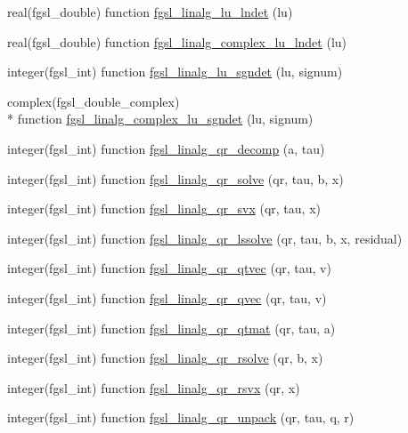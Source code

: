 \begin{DoxyCompactItemize}
\item 
real(fgsl\-\_\-double) function \hyperlink{linalg_8finc_a52edf61cc5516e7caf8519816c749ab8}{fgsl\-\_\-linalg\-\_\-lu\-\_\-lndet} (lu)
\item 
real(fgsl\-\_\-double) function \hyperlink{linalg_8finc_a92abce3042e05ad514f7f22b06ed8c27}{fgsl\-\_\-linalg\-\_\-complex\-\_\-lu\-\_\-lndet} (lu)
\item 
integer(fgsl\-\_\-int) function \hyperlink{linalg_8finc_ad630c42318782e35aae8ddf417c988c7}{fgsl\-\_\-linalg\-\_\-lu\-\_\-sgndet} (lu, signum)
\item 
complex(fgsl\-\_\-double\-\_\-complex) \\*
function \hyperlink{linalg_8finc_a3ac75e4a38e037d1b4b652e84030665b}{fgsl\-\_\-linalg\-\_\-complex\-\_\-lu\-\_\-sgndet} (lu, signum)
\item 
integer(fgsl\-\_\-int) function \hyperlink{linalg_8finc_abae4bc6bf64efb5860b999ae7001bda7}{fgsl\-\_\-linalg\-\_\-qr\-\_\-decomp} (a, tau)
\item 
integer(fgsl\-\_\-int) function \hyperlink{linalg_8finc_a453aab0af228f854c2c4e21af6e0f950}{fgsl\-\_\-linalg\-\_\-qr\-\_\-solve} (qr, tau, b, x)
\item 
integer(fgsl\-\_\-int) function \hyperlink{linalg_8finc_a7029ed3e4a0df13a7599a87f5260e377}{fgsl\-\_\-linalg\-\_\-qr\-\_\-svx} (qr, tau, x)
\item 
integer(fgsl\-\_\-int) function \hyperlink{linalg_8finc_afee3a0235231a2e3707a21e1fb07173a}{fgsl\-\_\-linalg\-\_\-qr\-\_\-lssolve} (qr, tau, b, x, residual)
\item 
integer(fgsl\-\_\-int) function \hyperlink{linalg_8finc_a6987f9175c49215f6c78c48de3f01a1d}{fgsl\-\_\-linalg\-\_\-qr\-\_\-qtvec} (qr, tau, v)
\item 
integer(fgsl\-\_\-int) function \hyperlink{linalg_8finc_a8052f69f7485e6a05de0b1be501ed840}{fgsl\-\_\-linalg\-\_\-qr\-\_\-qvec} (qr, tau, v)
\item 
integer(fgsl\-\_\-int) function \hyperlink{linalg_8finc_a261ef794cdf8d3055ef837dd3691f785}{fgsl\-\_\-linalg\-\_\-qr\-\_\-qtmat} (qr, tau, a)
\item 
integer(fgsl\-\_\-int) function \hyperlink{linalg_8finc_a1560faca27750ff17598a738727114e2}{fgsl\-\_\-linalg\-\_\-qr\-\_\-rsolve} (qr, b, x)
\item 
integer(fgsl\-\_\-int) function \hyperlink{linalg_8finc_a0ea403e6c3ec1e67b25bfe4d6b710077}{fgsl\-\_\-linalg\-\_\-qr\-\_\-rsvx} (qr, x)
\item 
integer(fgsl\-\_\-int) function \hyperlink{linalg_8finc_af11174059688ffdbc3f368d6b1a731ee}{fgsl\-\_\-linalg\-\_\-qr\-\_\-unpack} (qr, tau, q, r)

\end{DoxyCompactItemize}
